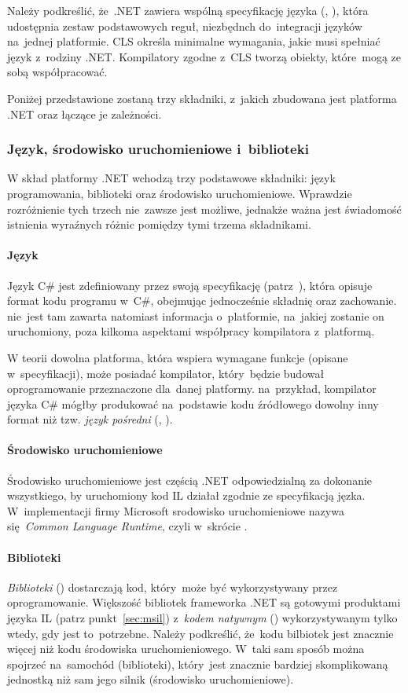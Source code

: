 Należy podkreślić, że~.NET zawiera wspólną specyfikację języka (, ), która udostępnia zestaw podstawowych reguł, niezbędnch do~integracji języków na~jednej platformie. CLS określa minimalne wymagania, jakie musi spełniać język z~rodziny .NET. Kompilatory zgodne z~CLS tworzą obiekty, które~mogą ze sobą współpracować.

Poniżej przedstawione zostaną trzy składniki, z~jakich zbudowana jest platforma .NET oraz łączące je zależności.

\subsubsection{Język, środowisko uruchomieniowe i~biblioteki}
W skład platformy .NET wchodzą trzy podstawowe składniki: język programowania, biblioteki oraz środowisko uruchomieniowe. Wprawdzie rozróżnienie tych trzech nie~zawsze jest możliwe, jednakże ważna jest świadomość istnienia wyraźnych różnic pomiędzy tymi trzema składnikami.

\paragraph{Język}
Język C\# jest zdefiniowany przez swoją specyfikację (patrz~\cite{cSharp:spec}), która opisuje format kodu programu w~C\#, obejmując jednocześnie składnię oraz zachowanie. nie~jest tam zawarta natomiast informacja o~platformie, na~jakiej zostanie on uruchomiony, poza kilkoma aspektami współpracy kompilatora z~platformą. 

W teorii dowolna platforma, która wspiera wymagane funkcje (opisane w~specyfikacji), może posiadać kompilator, który~będzie budował oprogramowanie przeznaczone dla~danej platformy.  na~przykład, kompilator języka C\# mógłby produkować na~podstawie kodu źródłowego dowolny inny format niż tzw. \emph{język pośredni} (, ).

\paragraph{Środowisko uruchomieniowe}
Środowisko uruchomieniowe jest częścią .NET odpowiedzialną za dokonanie wszystkiego, by uruchomiony kod IL działał zgodnie ze specyfikacją jęzka. W~implementacji firmy Microsoft srodowisko uruchomieniowe nazywa się~\emph{Common Language Runtime}, czyli w~skrócie .

\paragraph{Biblioteki}
\emph{Biblioteki} () dostarczają kod, który~może być wykorzystywany przez oprogramowanie. Większość bibliotek frameworka .NET są gotowymi produktami języka IL (patrz punkt~\ref{sec:msil}) z~\emph{kodem natywnym} () wykorzystywanym tylko wtedy, gdy jest to~potrzebne. Należy podkreślić, że~kodu bilbiotek jest znacznie więcej niż kodu środowiska uruchomieniowego. W~taki sam sposób można spojrzeć na~samochód (biblioteki), który~jest znacznie bardziej skomplikowaną jednostką niż sam jego silnik (środowisko uruchomieniowe).

